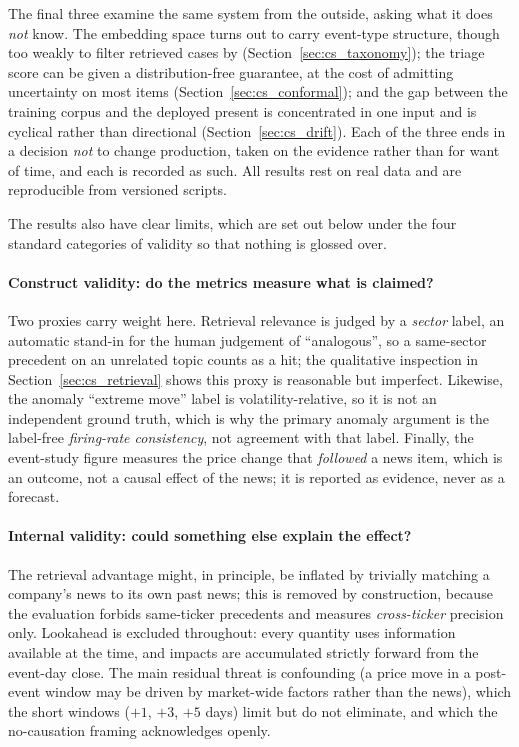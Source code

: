 The final three examine the same system from the outside, asking what it does \emph{not} know. The
embedding space turns out to carry event-type structure, though too weakly to filter retrieved cases by
(Section~\ref{sec:cs_taxonomy}); the triage score can be given a distribution-free guarantee, at the
cost of admitting uncertainty on most items (Section~\ref{sec:cs_conformal}); and the gap between the
training corpus and the deployed present is concentrated in one input and is cyclical rather than
directional (Section~\ref{sec:cs_drift}). Each of the three ends in a decision
\emph{not} to change production, taken on the evidence rather than for want of time, and each is
recorded as such. All results rest on real data and are reproducible from versioned scripts.

The results also have clear limits, which are set out below under the four standard categories of
validity so that nothing is glossed over.

\paragraph{Construct validity: do the metrics measure what is claimed?} Two proxies carry weight here.
Retrieval relevance is judged by a \emph{sector} label, an automatic stand-in for the human judgement of
``analogous'', so a same-sector precedent on an unrelated topic counts as a hit; the qualitative inspection
in Section~\ref{sec:cs_retrieval} shows this proxy is reasonable but imperfect. Likewise, the anomaly
``extreme move'' label is volatility-relative, so it is not an independent ground truth, which is
why the primary anomaly argument is the label-free \emph{firing-rate consistency}, not agreement
with that label. Finally, the event-study figure measures the price change that \emph{followed} a news
item, which is an outcome, not a causal effect of the news; it is reported as evidence, never as a forecast.

\paragraph{Internal validity: could something else explain the effect?} The retrieval advantage might,
in principle, be inflated by trivially matching a company's news to its own past news; this is removed by
construction, because the evaluation forbids same-ticker precedents and measures \emph{cross-ticker}
precision only. Lookahead is excluded throughout: every quantity uses information available at the time,
and impacts are accumulated strictly forward from the event-day close. The main residual threat is
confounding (a price move in a post-event window may be driven by market-wide factors rather than the
news), which the short windows ($+1$, $+3$, $+5$ days) limit but do not eliminate, and which the
no-causation framing acknowledges openly.

